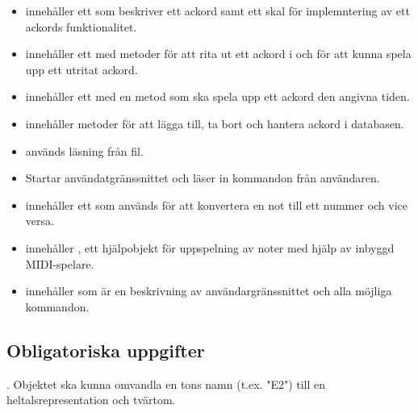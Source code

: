 \begin{itemize}
\item {} innehåller ett  som beskriver ett ackord samt ett skal för implemntering av ett ackords funktionalitet.
\item {} innehåller ett  med metoder för att rita ut ett ackord i  och för att kunna spela upp ett utritat ackord.
\item {} innehåller ett  med en metod  som ska spela upp ett ackord den angivna tiden.
\item {} innehåller metoder för att lägga till, ta bort och hantera ackord i databasen.
\item {} används läsning från fil.
\item {} Startar användatgränssnittet och läser in kommandon från användaren.
\item {} innehåller ett  som används för att konvertera en not till ett nummer och vice versa.
\item {} innehåller , ett hjälpobjekt för uppspelning av noter med hjälp av inbyggd MIDI-spelare.
\item {} innehåller  som är en beskrivning av användargränssnittet och alla möjliga kommandon.
\end{itemize}

\subsection{Obligatoriska uppgifter}

\Task {}. Objektet ska kunna omvandla en tons namn (t.ex. "E2") till
en heltalsrepresentation och tvärtom.

